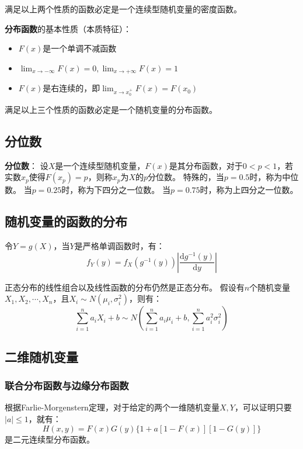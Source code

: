 \documentclass[a4paper,12pt]{ctexart}
\begin{document}
满足以上两个性质的函数必定是一个连续型随机变量的密度函数。

\textbf{分布函数}的基本性质（本质特征）：
\begin{itemize}
	\item $F(x)$是一个单调不减函数
	\item $\lim_{x\rightarrow-\infty}F(x) = 0,\lim_{x\rightarrow+\infty}F(x) = 1$
	\item $F(x)$是右连续的，即$\lim_{x\rightarrow x_0^+}F(x) = F(x_0)$
\end{itemize}

满足以上三个性质的函数必定是一个随机变量的分布函数。

\subsection{分位数}

\textbf{分位数}：
设$X$是一个连续型随机变量，$F(x)$是其分布函数，对于$0<p<1$，若实数$x_p$使得$F(x_p) = p$，则称$x_p$为$X$的$p$分位数。
特殊的，当$p = 0.5$时，称为中位数。
当$p = 0.25$时，称为下四分之一位数。
当$p = 0.75$时，称为上四分之一位数。

\subsection{随机变量的函数的分布}

令$Y = g(X)$，当$Y$是严格单调函数时，有：
\begin{equation*}
	f_Y(y) = f_X(g^{-1}(y))\left|\frac{\mathrm{d}g^{-1}(y)}{\mathrm{d}y}\right|
\end{equation*}

正态分布的线性组合以及线性函数的分布仍然是正态分布。
假设有$n$个随机变量$X_1,X_2,\cdots,X_n$，且$X_i\sim N(\mu_i,\sigma_i^2)$，则有：
\begin{equation*}
	\sum_{i=1}^n a_i X_i + b \sim N\left(\sum_{i=1}^n a_i\mu_i + b, \sum_{i=1}^n a_i^2\sigma_i^2\right)
\end{equation*}

\subsection{二维随机变量}

\subsubsection{联合分布函数与边缘分布函数}

根据Farlie-Morgenstern定理，对于给定的两个一维随机变量$X,Y$，可以证明只要$|a| \leq 1$，就有：
\begin{equation*}
	H(x,y) = F(x)G(y) \{1 + a[1 - F(x)][1 - G(y)]\}
\end{equation*}
是二元连续型分布函数。
\end{document}
